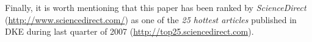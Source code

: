 Finally, it is worth mentioning that this paper has been ranked by
\emph{ScienceDirect} (\url{http://www.sciencedirect.com/}) as one of
the \emph{25 hottest articles} published in DKE during last quarter
of 2007 (\url{http://top25.sciencedirect.com}).



%
